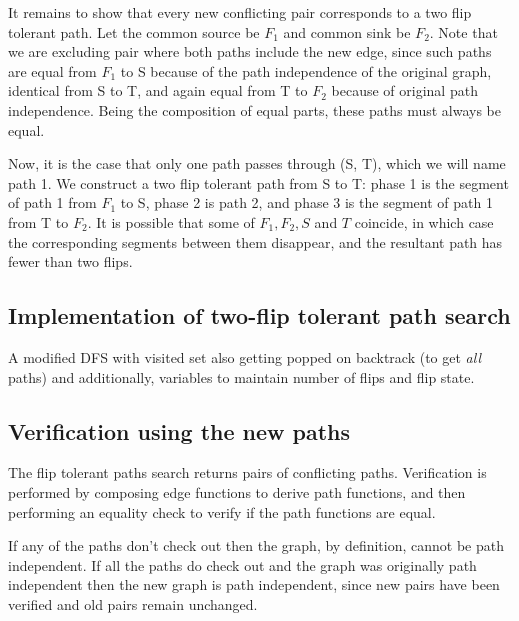 \documentclass{article}
\begin{document}
It remains to show that every new conflicting pair corresponds to a two flip tolerant path. Let the common source be $F_1$ and common sink be $F_2$. 
Note that we are excluding pair where both paths include the new edge, since such paths are equal from $F_1$ to S because of the path independence of the original graph, identical from S to T, and again equal from T to $F_2$ because of original path independence. Being the composition of equal parts, these paths must always be equal.

Now, it is the case that only one path passes through (S, T), which we will name path 1. We construct a two flip tolerant path from S to T: phase 1 is the segment of path 1 from $F_1$ to S, phase 2 is path 2, and phase 3 is the segment of path 1 from T to $F_2$. It is possible that some of $F_1, F_2, S$ and $T$ coincide, in which case the corresponding segments between them disappear, and the resultant path has fewer than two flips.


\subsection{Implementation of two-flip tolerant path search}
A modified DFS with visited set also getting popped on backtrack (to get \textit{all} paths) and additionally, variables to maintain number of flips and flip state.

\subsection{Verification using the new paths}
The flip tolerant paths search returns pairs of conflicting paths. Verification is performed by composing edge functions to derive path functions, and then performing an equality check to verify if the path functions are equal.

If any of the paths don't check out then the graph, by definition, cannot be path independent. If all the paths do check out and the graph was originally path independent then the new graph is path independent, since new pairs have been verified and old pairs remain unchanged.

\end{document}
